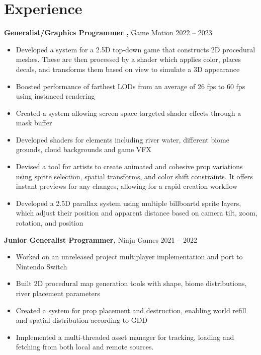 \documentclass[10pt]{article}       %
\begin{document}
\section*{Experience}
\textbf{Generalist/Graphics Programmer ,} {Game Motion} \hfill 2022 -- 2023\\
\vspace{-9pt}
\begin{itemize}
	\item Developed a system for a 2.5D top-down game that constructs 2D procedural meshes. These
	      are then processed by a shader which applies color, places decals, and transforms them based on view
	      to simulate a 3D appearance
	\item Boosted performance of farthest LODs from an average of 26 fps to 60 fps using instanced rendering
	\item Created a system allowing screen space targeted shader effects through a mask buffer
	\item Developed shaders for elements including river water, different biome grounds, cloud backgrounds and game VFX
	\item Devised a tool for artists to create animated and cohesive prop variations using sprite
	      selection, spatial transforms, and color shift constraints. It offers instant previews
	      for any changes, allowing for a rapid creation workflow
	\item Developed a 2.5D parallax system using multiple billboartd sprite layers, which adjust their position and apparent distance based on camera tilt, zoom, rotation, and position
\end{itemize}

\textbf{Junior Generalist Programmer,}  {Ninju Games} \hfill 2021 -- 2022 \\
\vspace{-9pt}
\begin{itemize}
	\item Worked on an unreleased project multiplayer implementation and port to Nintendo Switch
	\item Built 2D procedural map generation tools with shape, biome distributions, river placement parameters
	\item Created a system for prop placement and destruction, enabling world refill and spatial distribution according to GDD
	\item Implemented a multi-threaded asset manager for tracking, loading and fetching from both local and remote sources.
\end{itemize}
\end{document}
